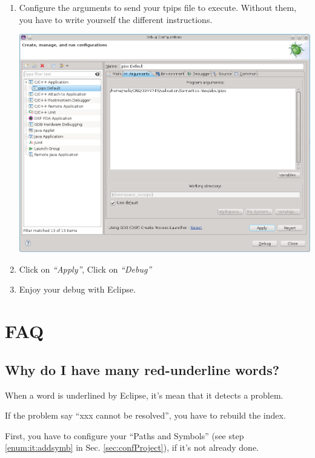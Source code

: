 \documentclass[a4paper]{article}
\begin{document}
\begin{enumerate}
\item Configure the arguments to send your tpips file to execute. 
Without them, you have to write yourself the different instructions.
\begin{center}
\noindent
\includegraphics[scale=0.4]{eclipse/07-eclipseJUNO-debug5.png}
\end{center}

\item Click on \emph{``Apply''}, Click on \emph{``Debug''}

\item Enjoy your debug with Eclipse.

\end{enumerate}

\newpage

\section{FAQ}

\subsection{Why do I have many red-underline words?}

When a word is underlined by Eclipse, it's mean that it detects a problem.

If the problem say ``xxx cannot be resolved'', you have to rebuild the index.

First, you have to configure your ``Paths and Symbols'' (see step \ref{enum:it:addsymb} in Sec. \ref{sec:confProject}), if it's not already done.
\end{document}
